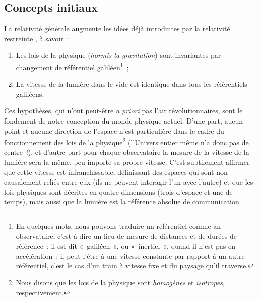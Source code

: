 \documentclass[../main/main.tex]{subfiles}
\begin{document}
\subsection{Concepts initiaux}\label{ssec:RG}

La relativité générale augmente les idées déjà introduites par la relativité
restreinte \citep[voir][et les autres articles de l'\textit{annus
mirabilis}\footnote{C'est ainsi que nous nommons l'année 1905 pendant laquelle
    \textsc{Einstein} publie quatre articles considérés comme étant à l'origine
de la physique moderne.}]{einstein1905}, à savoir~:
\begin{enumerate}
    \item Les lois de la physique (\textit{hormis la gravitation}) sont
        invariantes par changement de référentiel galiléen\footnote{En quelques
            mots, nous pouvons traduire un référentiel comme an observataire,
            c'est-à-dire un lieu de mesure de distances et de durées de
            référence~; il est dit «~galiléen~», ou «~inertiel~», quand il n'est
            pas en accélération~: il peut l'être à une vitesse constante par
            rapport à un autre référentiel, c'est le cas d'un train à vitesse
        fixe et du paysage qu'il traverse.}~;
    \item La vitesse de la lumière dans le vide est identique dans tous les
        référentiels galiléens.
\end{enumerate}

Ces hypothèses, qui n'ont peut-être \textit{a priori} pas l'air
révolutionnaires, sont le fondement de notre conception du monde physique
actuel. D'une part, aucun point et aucune direction de l'espace n'est
particulière dans le cadre du fonctionnement des lois de la
physique\footnote{Nous disons que les lois de la physique sont
\textit{homogènes} et \textit{isotropes}, respectivement.} (l'Univers entier même
n'a donc pas de centre~!), et d'autre part pour chaque observataire la mesure de
la vitesse de la lumière sera la même, peu importe sa propre vitesse. C'est
subtilement affirmer que cette vitesse est infranchissable, définissant des
espaces qui sont non causalement reliés entre eux (ils ne peuvent interagir l'un
avec l'autre) et que les lois physiques sont décrites en quatre dimensions
(trois d'espace et une de temps), mais aussi que la lumière est la référence
absolue de communication.
\end{document}
